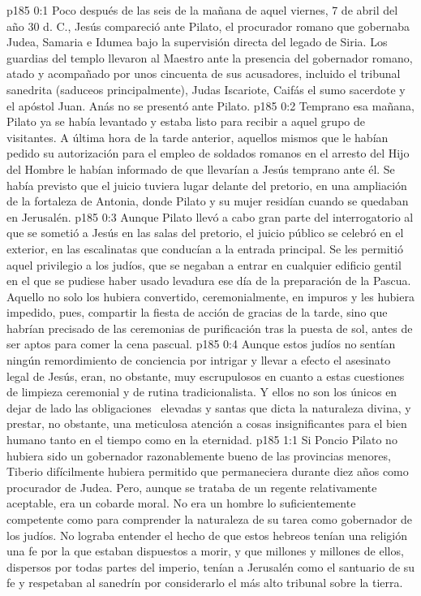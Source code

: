 \author{Comisión de seres intermedios}
\vs p185 0:1 Poco después de las seis de la mañana de aquel viernes, 7 de abril del año 30 d. C., Jesús compareció ante Pilato, el procurador romano que gobernaba Judea, Samaria e Idumea bajo la supervisión directa del legado de Siria. Los guardias del templo llevaron al Maestro ante la presencia del gobernador romano, atado y acompañado por unos cincuenta de sus acusadores, incluido el tribunal sanedrita (saduceos principalmente), Judas Iscariote, Caifás el sumo sacerdote y el apóstol Juan. Anás no se presentó ante Pilato.
\vs p185 0:2 Temprano esa mañana, Pilato ya se había levantado y estaba listo para recibir a aquel grupo de visitantes. A última hora de la tarde anterior, aquellos mismos que le habían pedido su autorización para el empleo de soldados romanos en el arresto del Hijo del Hombre le habían informado de que llevarían a Jesús temprano ante él. Se había previsto que el juicio tuviera lugar delante del pretorio, en una ampliación de la fortaleza de Antonia, donde Pilato y su mujer residían cuando se quedaban en Jerusalén.
\vs p185 0:3 Aunque Pilato llevó a cabo gran parte del interrogatorio al que se sometió a Jesús en las salas del pretorio, el juicio público se celebró en el exterior, en las escalinatas que conducían a la entrada principal. Se les permitió aquel privilegio a los judíos, que se negaban a entrar en cualquier edificio gentil en el que se pudiese haber usado levadura ese día de la preparación de la Pascua. Aquello no solo los hubiera convertido, ceremonialmente, en impuros y les hubiera impedido, pues, compartir la fiesta de acción de gracias de la tarde, sino que habrían precisado de las ceremonias de purificación tras la puesta de sol, antes de ser aptos para comer la cena pascual.
\vs p185 0:4 Aunque estos judíos no sentían ningún remordimiento de conciencia por intrigar y llevar a efecto el asesinato legal de Jesús, eran, no obstante, muy escrupulosos en cuanto a estas cuestiones de limpieza ceremonial y de rutina tradicionalista. Y ellos no son los únicos en dejar de lado las obligaciones  elevadas y santas que dicta la naturaleza divina, y prestar, no obstante, una meticulosa atención a cosas insignificantes para el bien humano tanto en el tiempo como en la eternidad.
\vs p185 1:1 Si Poncio Pilato no hubiera sido un gobernador razonablemente bueno de las provincias menores, Tiberio difícilmente hubiera permitido que permaneciera durante diez años como procurador de Judea. Pero, aunque se trataba de un regente relativamente aceptable, era un cobarde moral. No era un hombre lo suficientemente competente como para comprender la naturaleza de su tarea como gobernador de los judíos. No lograba entender el hecho de que estos hebreos tenían una religión  una fe por la que estaban dispuestos a morir, y que millones y millones de ellos, dispersos por todas partes del imperio, tenían a Jerusalén como el santuario de su fe y respetaban al sanedrín por considerarlo el más alto tribunal sobre la tierra.
